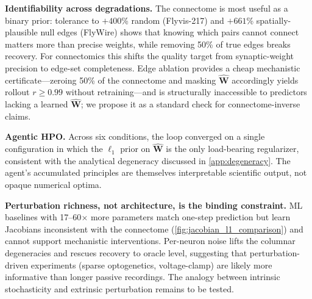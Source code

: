 \documentclass{article}
\begin{document}
\textbf{Identifiability across degradations.} The connectome is most useful as a binary prior: tolerance to $+400$\% random (Flyvis-217) and $+661$\% spatially-plausible null edges (FlyWire) shows that knowing which pairs cannot connect matters more than precise weights, while removing 50\% of true edges breaks recovery.
For connectomics this shifts the quality target from synaptic-weight precision to edge-set completeness.
Edge ablation provides a cheap mechanistic certificate---zeroing 50\% of the connectome and masking $\hat{\mathbf{W}}$ accordingly yields rollout $r \geq 0.99$ without retraining---and is structurally inaccessible to predictors lacking a learned $\hat{\mathbf{W}}$; we propose it as a standard check for connectome-inverse claims.

\textbf{Agentic HPO.} Across six conditions, the loop converged on a single configuration in which the $\ell_1$ prior on $\hat{\mathbf{W}}$ is the only load-bearing regularizer, consistent with the analytical degeneracy discussed in \cref{app:degeneracy}.  The agent's accumulated principles are themselves interpretable scientific output, not opaque numerical optima.

\textbf{Perturbation richness, not architecture, is the binding constraint.} ML baselines with 17--60$\times$ more parameters match one-step prediction but learn Jacobians inconsistent with the connectome (\cref{fig:jacobian_l1_comparison}) and cannot support mechanistic interventions.
Per-neuron noise lifts the columnar degeneracies and rescues recovery to oracle level, suggesting that perturbation-driven experiments (sparse optogenetics, voltage-clamp) are likely more informative than longer passive recordings.  The analogy between intrinsic stochasticity and extrinsic perturbation remains to be tested.




\end{document}

